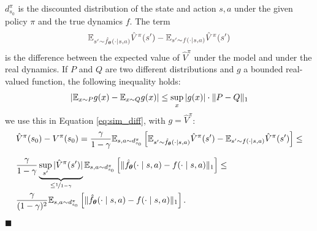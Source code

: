 \documentclass[10pt, a4paper]{report}
\begin{document}
$d_{s_0}^\pi$ is the discounted distribution of the state and action $s,a$ under the given policy $\pi$ and the true dynamics $f$. 
The term$$\grayText{\VA_{s'\sim \hat f_\btheta(\cdot\mid s,a)}\hat V^\pi(s')-
            \VA_{s'\sim  f(\cdot\mid s,a)} \hat V^\pi(s')}$$
is the difference between the expected value of $\hat V^\pi$ under the model and under the real dynamics. If $P$ and $Q$ are two different distributions and $g$ a bounded real-valued function, the following inequality holds:\begin{equation}
    \left|
        {\mathbb E}_{x\sim P}g(x)-{\mathbb E}_{x\sim Q}g(x)
    \right|\le\sup_x|g(x)|\cdot\|P-Q\|_1
\end{equation}
we use this in Equation \eqref{eq:sim_diff}, with $g=\hat V^\pi$:\begin{align}
    &\hat V^\pi(s_0)-  V^\pi(s_0)=\frac{\gamma}{1-\gamma}
        {\mathbb E}_{s,a\sim d_{s_0}^\pi}\left[
            {{\mathbb E}_{s'\sim \hat f_{\boldsymbol{\theta}}(\cdot\mid s,a)}\hat V^\pi(s')-
            {\mathbb E}_{s'\sim  f(\cdot\mid s,a)} \hat V^\pi(s')}
        \right]\le\\[1.5ex]
    &\frac{\gamma}{1-\gamma}\underbrace{\sup_{s'}|\hat V^\pi(s')|}_{\le\nicefrac{1}{1-\gamma}}{\mathbb E}_{s,a\sim d_{s_0}^\pi}\left[\|
    \hat f_{\boldsymbol{\theta}} (\cdot\mid s,a)-f (\cdot\mid s,a)
    \|_1\right]\le\\ 
    &\frac{\gamma}{(1-\gamma)^2}{\mathbb E}_{s,a\sim d_{s_0}^\pi}\left[\|
    \hat f_{\boldsymbol{\theta}} (\cdot\mid s,a)-f (\cdot\mid s,a)
    \|_1\right].
\end{align}\hfill$\blacksquare$\bigskip
\end{document}
